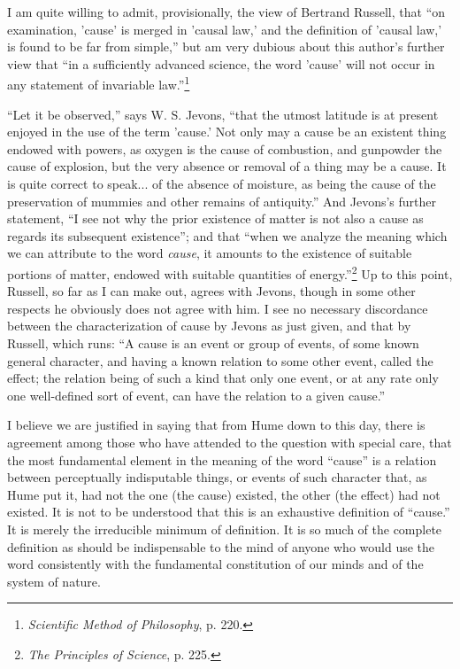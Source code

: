 \documentclass[a4paper, 11pt, oneside, polutonikogreek, english]{article}
\begin{document}
I am quite willing to admit, provisionally, the view of Bertrand Russell, that ``on examination, 'cause' is merged in 'causal law,' and the definition of 'causal law,' is found to be far from simple,'' but am very dubious about this author's further view that ``in a sufficiently advanced science, the word 'cause' will not occur in any statement of invariable law.''\footnote{\emph{Scientific Method of Philosophy}, p. 220.}

``Let it be observed,'' says W. S. Jevons, ``that the utmost latitude is at present enjoyed in the use of the term 'cause.' Not only may a cause be an existent thing endowed with powers, as oxygen is the cause of combustion, and gunpowder the cause of explosion, but the very absence or removal of a thing may be a cause. It is quite correct to speak... of the absence of moisture, as being the cause of the preservation of mummies and other remains of antiquity.'' And Jevons's further statement, ``I see not why the prior existence of matter is not also a cause as regards its subsequent existence''; and that ``when we analyze the meaning which we can attribute to the word \emph{cause}, it amounts to the existence of suitable portions of matter, endowed with suitable quantities of energy.''\footnote{\emph{The Principles of Science}, p. 225.} Up to this point, Russell, so far as I can make out, agrees with Jevons, though in some other respects he obviously does not agree with him. I see no necessary discordance between the characterization of cause by Jevons as just given, and that by Russell, which runs: ``A cause is an event or group of events, of some known general character, and having a known relation to some other event, called the effect; the relation being of such a kind that only one event, or at any rate only one well-defined sort of event, can have the relation to a given cause.''

I believe we are justified in saying that from Hume down to this day, there is agreement among those who have attended to the question with special care, that the most fundamental element in the meaning of the word ``cause'' is a relation between perceptually indisputable things, or events of such character that, as Hume put it, had not the one (the cause) existed, the other (the effect) had not existed. It is not to be understood that this is an exhaustive definition of ``cause.'' It is merely the irreducible minimum of definition. It is so much of the complete definition as should be indispensable to the mind of anyone who would use the word consistently with the fundamental constitution of our minds and of the system of nature.
\end{document}
